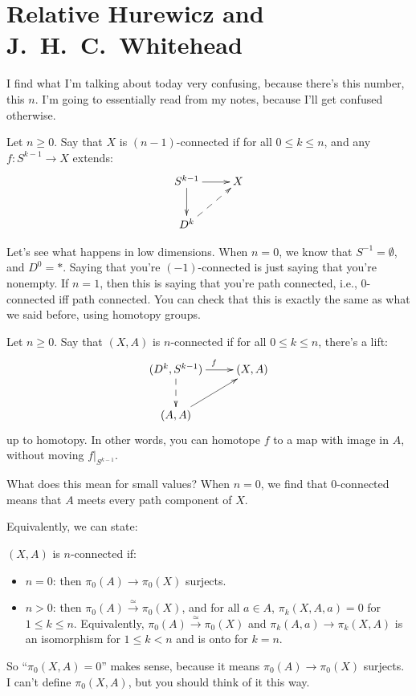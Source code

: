 \section{Relative Hurewicz and J.~H.~C.~Whitehead}
I find what I'm talking about today very confusing, because there's this number, this $n$. I'm going to essentially read from my notes, because I'll get confused otherwise.
\begin{definition}
    Let $n\geq 0$. Say that $X$ is $(n-1)$-connected if for all $0\leq k\leq n$, and any $f:S^{k-1}\to X$ extends:
    \begin{equation*}
	\xymatrix{
	S^{k-1}\ar[d]\ar[r] & X\\
	D^k\ar@{-->}[ur] & 
	}
    \end{equation*}
\end{definition}
    Let's see what happens in low dimensions. When $n=0$, we know that $S^{-1} = \emptyset$, and $D^0 = \ast$. Saying that you're $(-1)$-connected is just saying that you're nonempty. If $n=1$, then this is saying that you're path connected, i.e., $0$-connected iff path connected. You can check that this is exactly the same as what we said before, using homotopy groups.

\begin{definition}
    Let $n\geq 0$. Say that $(X,A)$ is $n$-connected if for all $0\leq k\leq n$, there's a lift:
    \begin{equation*}
	\xymatrix{
	    (D^k,S^{k-1})\ar[r]^f\ar@{-->}[d] & (X,A)\\
	    (A,A)\ar[ur] & 
	    }
    \end{equation*}
    up to homotopy. In other words, you can homotope $f$ to a map with image in $A$, without moving $f|_{S^{k-1}}$.
\end{definition}
What does this mean for small values? When $n=0$, we find that $0$-connected means that $A$ meets every path component of $X$.

Equivalently, we can state:
    \begin{definition}
	$(X,A)$ is $n$-connected if:
	\begin{itemize}
	    \item $n=0$: then $\pi_0(A)\to \pi_0(X)$ surjects.
	    \item $n>0$: then $\pi_0(A)\xrightarrow{\simeq}\pi_0(X)$, and for all $a\in A$, $\pi_k(X,A,a) = 0$ for $1\leq k\leq n$. Equivalently, $\pi_0(A)\xrightarrow{\simeq}\pi_0(X)$ and $\pi_k(A,a)\to\pi_k(X,A)$ is an isomorphism for $1\leq k<n$ and is onto for $k=n$.
	\end{itemize}
    \end{definition}
    So ``$\pi_0(X,A) = 0$'' makes sense, because it means $\pi_0(A)\to \pi_0(X)$ surjects. I can't define $\pi_0(X,A)$, but you should think of it this way.

